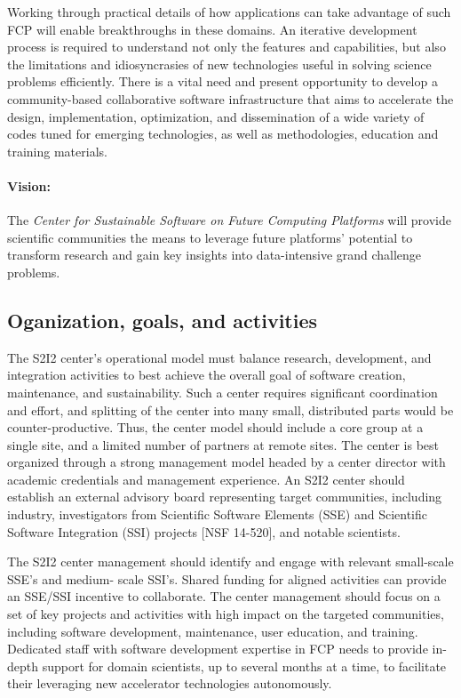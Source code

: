 Working through practical details of how applications can take advantage of such FCP will enable breakthroughs in these domains. 
An iterative development process is required to understand not only the features and capabilities, but also the limitations and idiosyncrasies of new technologies useful in solving science problems efficiently. 
There is a vital need and present opportunity to develop a community-based collaborative software infrastructure that aims to accelerate the design, implementation, optimization, and dissemination of a wide variety of codes tuned for emerging technologies, as well as methodologies, education and training materials.

\paragraph{Vision:} The \textit{Center for Sustainable Software on Future Computing Platforms} will provide scientific communities the means to leverage future platforms’ potential to transform research and gain key insights into data-intensive grand challenge problems.


\subsection{Oganization, goals, and activities}
The S2I2 center's operational model must balance research, development, and integration activities to best achieve the overall goal of software creation, maintenance, and sustainability. Such a center requires significant coordination and effort, and splitting of the center into many small, distributed parts would be counter-productive.  
Thus, the center model should include a core group at a single site, and a limited number of partners at remote sites. 
The center is best organized through a strong management model headed by a center director with academic credentials and management experience. 
An S2I2 center should establish an external advisory board representing target communities, including industry, investigators from Scientific Software Elements (SSE) and Scientific Software Integration (SSI) projects [NSF 14-520], and notable scientists.

The S2I2 center management should identify and engage with relevant small-scale SSE's and medium- scale SSI's. Shared funding for aligned activities can provide an SSE/SSI incentive to collaborate. 
The center management should focus on a set of key projects and activities with high impact on the targeted communities, including software development, maintenance, user education, and training. 
Dedicated staff with software development expertise in FCP needs to provide in-depth support for domain scientists, up to several months at a time, to facilitate their leveraging new accelerator technologies autonomously.

